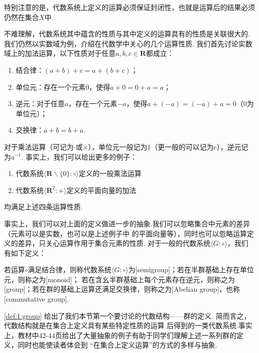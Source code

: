 特别注意的是，代数系统上定义的运算必须保证封闭性，也就是运算后的结果必须仍然在集合$X$中.

不难理解，代数系统其中蕴含的性质与其中定义的运算具有的性质是关联很大的.我们仍然以实数域为例，介绍在代数学中关心的几个运算性质.
我们首先讨论实数域上的加法运算，以下性质对于任意$a,b,c\in\mathbf{R}$都成立：

\begin{enumerate}
    \item 结合律：$(a+b)+c=a+(b+c)$；

    \item 单位元：存在一个元素0，使得$a+0=0+a=a$；

    \item 逆元：对于任意$a$，存在一个元素$-a$，使得$a+(-a)=(-a)+a=0$（0为单位元）；

    \item 交换律：$a+b=b+a$.
\end{enumerate}

对于乘法运算（可记为$\cdot$或$\times$），单位元一般记为1（更一般的可以记为$e$），逆元记为$a^{-1}$.
事实上，我们可以给出更多的例子：
\begin{example}\label{ex:1:abelgroup}
    \begin{enumerate}[label=(\arabic*)]
        \item 代数系统$\langle \mathbf{R}\backslash\{0\}:\circ\rangle$定义的一般乘法运算

        \item 代数系统$\langle \mathbf{R}^2:+\rangle$定义的平面向量的加法
    \end{enumerate}

    均满足上述四条运算性质.
\end{example}

事实上，我们可以对上面的定义做进一步的抽象.我们可以忽略集合中元素的差异（元素可以是实数，也可以是上述例子中
的平面向量等），同时也可以忽略运算定义的差异，只关心运算作用于集合元素的性质.
对于一般的代数系统$\langle G:\circ\rangle$，我们有如下定义：
\begin{definition} \label{def:1:group}
    若运算$\circ$满足结合律，则称代数系统$\langle G:\circ\rangle$为[semigroup]；若在半群基础上存在单位元，则称之为[monoid]；
    若在含幺半群基础上每个元素存在逆元，则称之为[group]；若在群的基础上运算还满足交换律，则称之为[Abelian group]，也称[commutative group].
\end{definition}

\autoref{def:1:group} 给出了我们本节第一个要讨论的代数结构——群的定义. 简而言之，代数结构就是在集合上定义具有某些特定性质的运算
后得到的一类代数系统.事实上，教材中42-44页给出了大量抽象的例子有助于同学们理解上述一系列群的定义，同时也能使读者体会到
``在集合上定义运算''的方式的多样与抽象.

